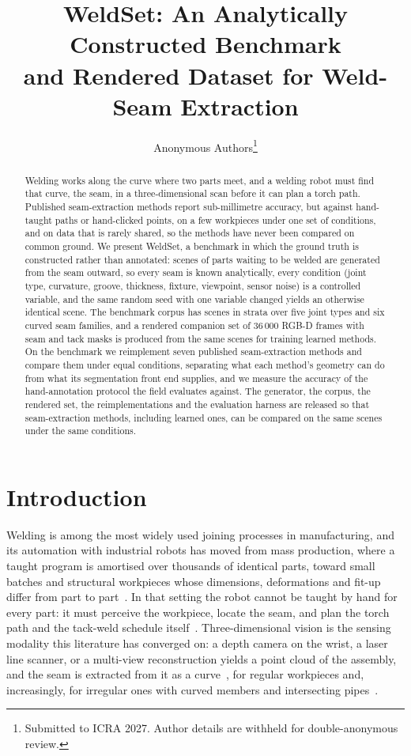 \documentclass[letterpaper, 10 pt, conference]{ieeeconf}
\title{\LARGE \bf
WeldSet: An Analytically Constructed Benchmark\\ and Rendered Dataset for Weld-Seam Extraction}
\author{Anonymous Authors\thanks{Submitted to ICRA 2027. Author details are withheld for double-anonymous review.}}
\begin{document}
\maketitle
\thispagestyle{empty}
\pagestyle{empty}

\begin{abstract}
Welding works along the curve where two parts meet, and a welding robot must find that curve, the seam, in a three-dimensional scan before it can plan a torch path. Published seam-extraction methods report sub-millimetre accuracy, but against hand-taught paths or hand-clicked points, on a few workpieces under one set of conditions, and on data that is rarely shared, so the methods have never been compared on common ground. We present WeldSet, a benchmark in which the ground truth is constructed rather than annotated: scenes of parts waiting to be welded are generated from the seam outward, so every seam is known analytically, every condition (joint type, curvature, groove, thickness, fixture, viewpoint, sensor noise) is a controlled variable, and the same random seed with one variable changed yields an otherwise identical scene. The benchmark corpus has \nScenes{} scenes in \nStrata{} strata over five joint types and six curved seam families, and a rendered companion set of 36\,000 RGB-D frames with seam and tack masks is produced from the same scenes for training learned methods. On the benchmark we reimplement seven published seam-extraction methods and compare them under equal conditions, separating what each method's geometry can do from what its segmentation front end supplies, and we measure the accuracy of the hand-annotation protocol the field evaluates against. The generator, the corpus, the rendered set, the reimplementations and the evaluation harness are released so that seam-extraction methods, including learned ones, can be compared on the same scenes under the same conditions.
\end{abstract}

\section{Introduction}

Welding is among the most widely used joining processes in manufacturing, and its automation with industrial robots has moved from mass production, where a taught program is amortised over thousands of identical parts, toward small batches and structural workpieces whose dimensions, deformations and fit-up differ from part to part~\cite{yi2026seam,zhang2025lobb,fang2024model}. In that setting the robot cannot be taught by hand for every part: it must perceive the workpiece, locate the seam, and plan the torch path and the tack-weld schedule itself~\cite{zhou2020pathplanning,wang2025laser}. Three-dimensional vision is the sensing modality this literature has converged on: a depth camera on the wrist, a laser line scanner, or a multi-view reconstruction yields a point cloud of the assembly, and the seam is extracted from it as a curve~\cite{yi2026seam,wang2024ppf,zhang2025lobb,wang2026pipe,li2026impeller}, for regular workpieces and, increasingly, for irregular ones with curved members and intersecting pipes~\cite{zhang2025lobb,wang2026pipe,wang2023tubesheet}.
\end{document}
